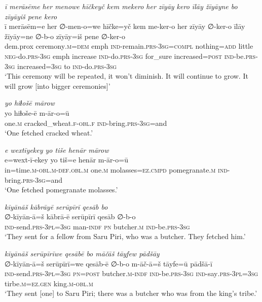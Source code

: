 \ea \label{ŽP.245}
\textit{ī merāsēme her menowe hīčkeyč kem mekero her zīyāy kero īlāy žīyāyne bo zīyāyiš pene kero} \\ 
\gll ī merāsēm=e her ∅-men-o=we hīčke=yč kem me-ker-o her zīyāy ∅-ker-o īlāy žīyāy=ne ∅-b-o zīyāy=iš pene ∅-ker-o \\ 
 dem.prox ceremony\textsc{.m}\textsc{=dem} emph \textsc{ind-}remain\textsc{.prs}\textsc{-3sg}\textsc{=compl} nothing\textsc{=add} little \textsc{neg-}do\textsc{.prs}\textsc{-3sg} emph increase \textsc{ind-}do\textsc{.prs}\textsc{-3sg} for\_sure increased\textsc{=\textsc{post}} \textsc{ind-}be\textsc{.prs}\textsc{-3sg} increased\textsc{=3sg} to \textsc{ind-}do\textsc{.prs}\textsc{-3sg} \\ 
\glt `This ceremony will be repeated, it won’t diminish. It will continue to grow. It will grow [into bigger ceremonies]'
\z 
 
\ea \label{ŽP.247}
\textit{yo hiɫošē mārow} \\ 
\gll yo hiɫoše-ē m-ār-o=ū \\ 
 one\textsc{.m} cracked\_wheat\textsc{.f}\textsc{-obl}\textsc{.f} \textsc{ind-}bring\textsc{.prs}\textsc{-3sg}=and \\ 
\glt `One fetched cracked wheat.'
\z 
 
\ea \label{ŽP.249}
\textit{e wextīyekey yo tiše henār mārow} \\ 
\gll e=wext-ī-ekey yo tiš=e henār m-ār-o=ū \\ 
 in=time\textsc{.m}\textsc{-obl}\textsc{.m}\textsc{-def}\textsc{.obl}\textsc{.m} one\textsc{.m} molasses\textsc{=ez}\textsc{.cmpd} pomegranate\textsc{.m} \textsc{ind-}bring\textsc{.prs}\textsc{-3sg}=and \\ 
\glt `One fetched pomegranate molasses.'
\z 
 
\ea \label{ŽP.250}
\textit{kīyānāš kābrāyē serūpīrī qesāb bo} \\ 
\gll ∅-kīyān-ā=š kābrā-ē serūpīrī qesāb ∅-b-o \\ 
 \textsc{ind-}send\textsc{.prs}\textsc{-3pl}\textsc{=3sg} man\textsc{-indf} \textsc{pn} butcher\textsc{.m} \textsc{ind-}be\textsc{.prs}\textsc{-3sg} \\ 
\glt `They sent for a fellow from Saru Piri, who was a butcher. They fetched him.'
\z 
 
\ea \label{ŽP.251}
\textit{kīyānāš serūpīrīwe qesābē bo māčāš tāyfew pādšāy} \\ 
\gll ∅-kīyān-ā=š serūpīrī=we qesāb-ē ∅-b-o m-āč-ā=š tāyfe=ū pādšā-ī \\ 
 \textsc{ind-}send\textsc{.prs}\textsc{-3pl}\textsc{=3sg} \textsc{pn}\textsc{=\textsc{post}} butcher\textsc{.m}\textsc{-indf} \textsc{ind-}be\textsc{.prs}\textsc{-3sg} \textsc{ind-}say\textsc{.prs}\textsc{-3pl}\textsc{=3sg} tirbe\textsc{.m}\textsc{\textsc{=ez.gen}} king\textsc{.m}\textsc{-obl}\textsc{.m} \\ 
\glt `They sent [one] to Saru Piri; there was a butcher who was from the king’s tribe.'
\z 
 
